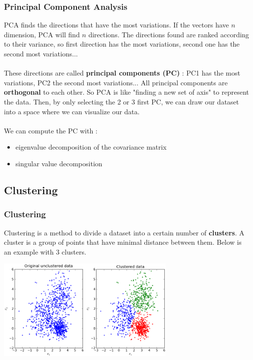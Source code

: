 \documentclass{beamer}
\begin{document}
\begin{frame}
  \frametitle{Principal Component Analysis}
  PCA finds the directions that have the most variations. If the vectors have
  $n$ dimension, PCA will find $n$ directions. The directions found are ranked
  according to their variance, so first direction has the most variations,
  second one has the second most variations...\\~\\

  These directions are called \textbf{principal components (PC)} : PC1 has the most
  variations, PC2 the second most variations...
  All principal components are \textbf{orthogonal} to each other. So PCA is like
  "finding a new set of axis" to represent the data. Then, by only selecting the
  2 or 3 first PC, we can draw our dataset into a space where we can visualize
  our data.\\~\\

  We can compute the PC with :
  \begin{itemize}
    \item eigenvalue decomposition of the covariance matrix
    \item singular value decomposition
  \end{itemize}
\end{frame}

\subsection{Clustering}
\begin{frame}
  \frametitle{Clustering}
  Clustering is a method to divide a dataset into a certain number of
  \textbf{clusters}. A cluster is a group of points that have minimal distance
  between them. Below is an example with 3 clusters.

  \center
  \includegraphics[height=5cm]{img/kmeans.png}
\end{frame}
\end{document}
